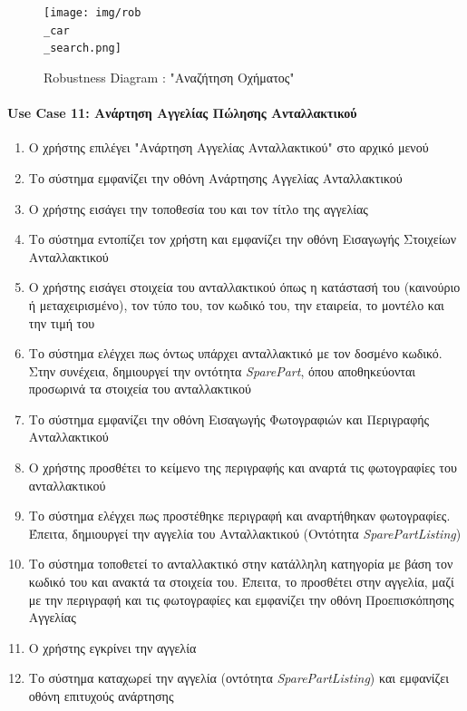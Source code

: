 \documentclass{../ol-softwaremanual}
\begin{document}
	
	\begin{figure}[htbp!]
		\texttt{[image: img/rob\\\_car\\\_search.png]}
		\caption{\en Robustness Diagram : "\gr Αναζήτηση Οχήματος\en"\gr}
	\end{figure}
	
	
	
	\newpage
	\centering
	\paragraph{\en Use Case 11: \gr Ανάρτηση Αγγελίας Πώλησης Ανταλλακτικού \gr}
	
	\begin{enumerate}
		\item Ο χρήστης επιλέγει \en"\gr Ανάρτηση Αγγελίας Ανταλλακτικού\en" \gr στο αρχικό μενού
		\item Το σύστημα εμφανίζει την οθόνη Ανάρτησης Αγγελίας Ανταλλακτικού
		\item Ο χρήστης εισάγει την τοποθεσία του και τον τίτλο της αγγελίας
		\item Το σύστημα εντοπίζει τον χρήστη και εμφανίζει την οθόνη Εισαγωγής Στοιχείων Ανταλλακτικού
		\item Ο χρήστης εισάγει στοιχεία του ανταλλακτικού όπως η κατάστασή του (καινούριο ή μεταχειρισμένο), τον τύπο του, τον κωδικό του, την εταιρεία, το μοντέλο και την τιμή του
		\item Το σύστημα ελέγχει πως όντως υπάρχει ανταλλακτικό με τον δοσμένο κωδικό. Στην συνέχεια, δημιουργεί την οντότητα \en \textit{SparePart}\gr, όπου αποθηκεύονται προσωρινά τα στοιχεία του ανταλλακτικού 
		\item Το σύστημα εμφανίζει την οθόνη Εισαγωγής Φωτογραφιών και Περιγραφής Ανταλλακτικού
		\item Ο χρήστης προσθέτει το κείμενο της περιγραφής και αναρτά τις φωτογραφίες του ανταλλακτικού
		\item Το σύστημα ελέγχει πως προστέθηκε περιγραφή και αναρτήθηκαν φωτογραφίες. Έπειτα, δημιουργεί την αγγελία του Ανταλλακτικού (Οντότητα \en\textit{SparePartListing}\gr)
		\item Το σύστημα τοποθετεί το ανταλλακτικό στην κατάλληλη κατηγορία με βάση τον κωδικό του και ανακτά τα στοιχεία του. Έπειτα, το προσθέτει στην αγγελία, μαζί με την περιγραφή και τις φωτογραφίες και εμφανίζει την οθόνη Προεπισκόπησης Αγγελίας
		\item Ο χρήστης εγκρίνει την αγγελία
		\item Το σύστημα καταχωρεί την αγγελία (οντότητα \en\textit{SparePartListing}\gr) και εμφανίζει οθόνη επιτυχούς ανάρτησης
	\end{enumerate}
	
\end{document}
